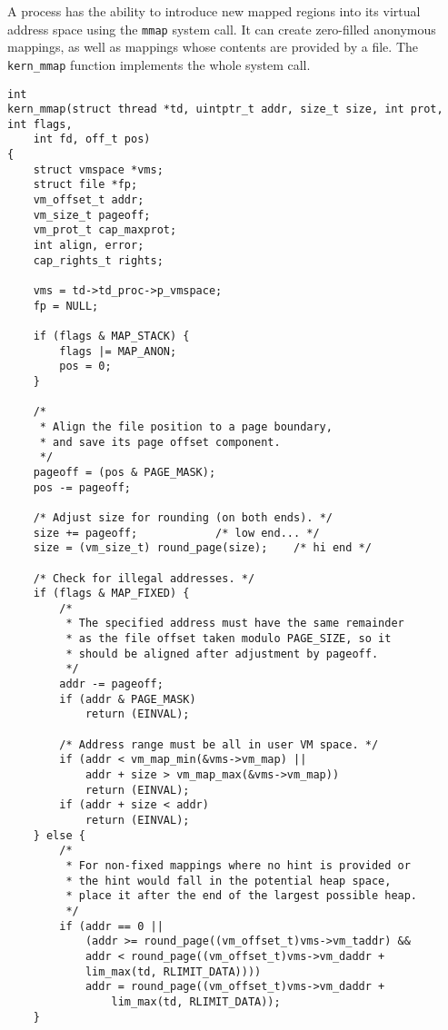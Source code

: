 \documentclass[shortabstract, english]{iithesis}
\newenvironment{code}{}{}
\begin{document}
A process has the ability to introduce new mapped regions into its virtual
address space using the \texttt{mmap} system call. It can create zero-filled
anonymous mappings, as well as mappings whose contents are provided by a file.
The \texttt{kern_mmap} function implements the whole system call.

\begin{code}
\begin{verbatim}
int
kern_mmap(struct thread *td, uintptr_t addr, size_t size, int prot, int flags,
    int fd, off_t pos)
{
    struct vmspace *vms;
    struct file *fp;
    vm_offset_t addr;
    vm_size_t pageoff;
    vm_prot_t cap_maxprot;
    int align, error;
    cap_rights_t rights;

    vms = td->td_proc->p_vmspace;
    fp = NULL;

    if (flags & MAP_STACK) {
        flags |= MAP_ANON;
        pos = 0;
    }

    /*
     * Align the file position to a page boundary,
     * and save its page offset component.
     */
    pageoff = (pos & PAGE_MASK);
    pos -= pageoff;

    /* Adjust size for rounding (on both ends). */
    size += pageoff;            /* low end... */
    size = (vm_size_t) round_page(size);    /* hi end */

    /* Check for illegal addresses. */
    if (flags & MAP_FIXED) {
        /*
         * The specified address must have the same remainder
         * as the file offset taken modulo PAGE_SIZE, so it
         * should be aligned after adjustment by pageoff.
         */
        addr -= pageoff;
        if (addr & PAGE_MASK)
            return (EINVAL);

        /* Address range must be all in user VM space. */
        if (addr < vm_map_min(&vms->vm_map) ||
            addr + size > vm_map_max(&vms->vm_map))
            return (EINVAL);
        if (addr + size < addr)
            return (EINVAL);
    } else {
        /*
         * For non-fixed mappings where no hint is provided or
         * the hint would fall in the potential heap space,
         * place it after the end of the largest possible heap.
         */
        if (addr == 0 ||
            (addr >= round_page((vm_offset_t)vms->vm_taddr) &&
            addr < round_page((vm_offset_t)vms->vm_daddr +
            lim_max(td, RLIMIT_DATA))))
            addr = round_page((vm_offset_t)vms->vm_daddr +
                lim_max(td, RLIMIT_DATA));
    }


\end{verbatim}
\end{code}
\end{document}

